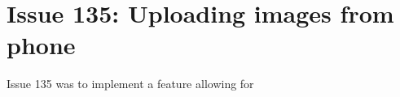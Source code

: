 \section{Issue 135: Uploading images from phone}

Issue 135 was to implement a feature allowing for 